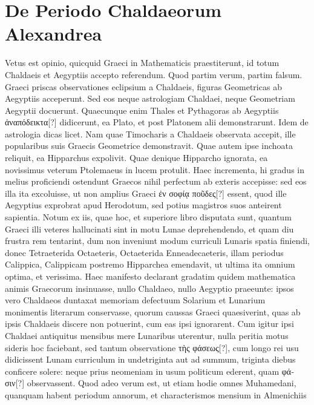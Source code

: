 \section{De Periodo Chaldaeorum Alexandrea}
%
Vetus est opinio, quicquid Graeci in Mathematicis praestiterunt,
id totum Chaldaeis et Aegyptiis accepto referendum.
Quod partim verum, partim falsum.
Graeci priscas observationes
eclipsium %
 a Chaldaeis, figuras Geometricas ab Aegyptiis acceperunt.
Sed eos neque astrologiam Chaldaei, neque Geometriam Aegyptii docuerunt.
Quaecunque enim Thales et Pythagoras ab Aegyptiis
 \textgreek{ἀναπόδεικτα[?]}
didicerunt, ea Plato, et post Platonem alii demonstrarunt.
Idem de astrologia dicas licet.
Nam quae Timocharis a Chaldaeis observata
accepit, ille popularibus suis Graecis Geometrice demonstravit.
Quae autem ipse inchoata reliquit, ea Hipparchus expolivit.
Quae
denique Hipparcho ignorata, ea novissimus veterum Ptolemaeus
in lucem protulit.
Haec incrementa, hi gradus in melius proficiendi
ostendunt Graecos nihil perfectum ab exteris accepisse: sed eos
illa ita excoluisse, ut non amplius Graeci
 \textgreek{ἐν σοφίᾳ ποῦδες[?]} essent, quod
ille Aegyptius exprobrat apud Herodotum, sed potius magistros suos
anteirent sapientia.
Notum ex iis, quae hoc, et superiore libro disputata
sunt, quantum Graeci illi veteres hallucinati sint in motu Lunae
deprehendendo, et quam diu frustra rem tentarint, dum non inveniunt
modum curriculi Lunaris spatia finiendi, donec Tetraeterida
Octaeteris, Octaeterida Enneadecaeteris, illam periodus Calippica,
Calippicam postremo Hipparchea emendavit, ut ultima ita omnium
optima, et verissima.
Haec manifesto declarant gradatim
quidem mathematica animis Graecorum insinuasse, nullo Chaldaeo,
nullo Aegyptio praeeunte: ipsos vero Chaldaeos duntaxat memoriam
defectuum Solarium et Lunarium monimentis literarum
conservasse, quorum caussas Graeci quaesiverint, quas ab ipsis
Chaldaeis discere non potuerint, cum eas ipsi ignorarent.
Cum igitur
ipsi Chaldaei antiquitus mensibus mere Lunaribus uterentur,
nulla peritia motus sideris hoc faciebant, sed tantum observatione
\textgreek{τὴς φάσεως[?]},
 cum longo rei usu didicissent Lunam curriculum in undetriginta
aut ad summum, triginta diebus conficere solere: neque prius neomeniam
in usum politicum ederent, quam \textgreek{φάσιν[?]} observassent.
%
Quod adeo verum est, ut etiam hodie omnes Muhamedani, quanquam
habent periodum annorum, et characterismos mensium in Almenichiis
